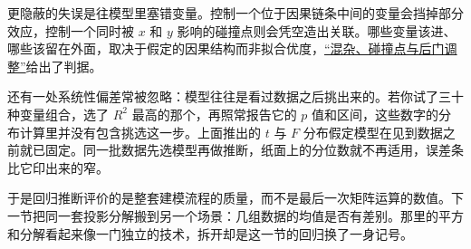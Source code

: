 更隐蔽的失误是往模型里塞错变量。控制一个位于因果链条中间的变量会挡掉部分效应，控制一个同时被 \(x\) 和 \(y\) 影响的碰撞点则会凭空造出关联。哪些变量该进、哪些该留在外面，取决于假定的因果结构而非拟合优度，\hyperref[sec:13-Machine-Learning/12-Causal-Inference/03]{``混杂、碰撞点与后门调整''}给出了判据。

还有一处系统性偏差常被忽略：模型往往是看过数据之后挑出来的。若你试了三十种变量组合，选了 \(R^2\) 最高的那个，再照常报告它的 \(p\) 值和区间，这些数字的分布计算里并没有包含挑选这一步。上面推出的 \(t\) 与 \(F\) 分布假定模型在见到数据之前就已固定。同一批数据先选模型再做推断，纸面上的分位数就不再适用，误差条比它印出来的窄。

于是回归推断评价的是整套建模流程的质量，而不是最后一次矩阵运算的数值。下一节把同一套投影分解搬到另一个场景：几组数据的均值是否有差别。那里的平方和分解看起来像一门独立的技术，拆开却是这一节的回归换了一身记号。
